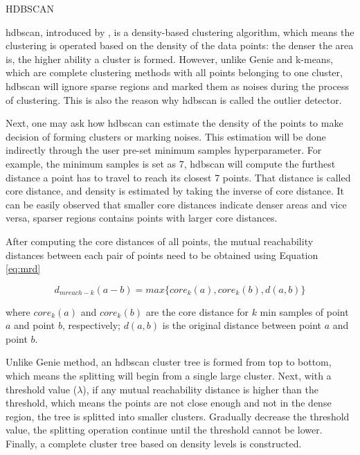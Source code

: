 \documentclass[a4paper,man,floatsintext,natbib,noextraspace]{apa6}
\makeatletter
\renewcommand{\subsubsection}{\@startsection{subsubsection}{3}
  {\z@}
  {\b@level@two@skip}
  {\e@level@two@skip}
  {\normalfont\normalsize\bfseries\itshape}}
\makeatother
\begin{document}
\subsubsection{HDBSCAN}

\gls{hdbscan}, introduced by \cite{campelloDensitybasedClusteringBased2013}, is a density-based clustering algorithm, which means the clustering is operated based on the density of the data points: the denser the area is, the higher ability a cluster is formed. However, unlike Genie and k-means, which are complete clustering methods with all points belonging to one cluster, \gls{hdbscan} will ignore sparse regions and marked them as noises during the process of clustering. This is also the reason why \gls{hdbscan} is called the outlier detector. 

Next, one may ask how \gls{hdbscan} can estimate the density of the points to make decision of forming clusters or marking noises. This estimation will be done indirectly through the user pre-set minimum samples hyperparameter. For example, the minimum samples is set as 7, \gls{hdbscan} will compute the furthest distance a point has to travel to reach its closest 7 points. That distance is called core distance, and density is estimated by taking the inverse of core distance. It can be easily observed that smaller core distances indicate denser areas and vice versa, sparser regions contains points with larger core distances.

After computing the core distances of all points, the mutual reachability distances between each pair of points need to be obtained using Equation \eqref{eq:mrd}

\begin{equation}\label{eq:mrd}
    d_{mreach-k}(a-b) = max\{core_{k}(a),core_{k}(b),d(a,b)\}
\end{equation}

where $core_{k}(a)$ and $core_{k}(b)$ are the core distance for $k$ min samples of point $a$ and point $b$, respectively; $d(a,b)$ is the original distance between point $a$ and point $b$. 

Unlike Genie method, an \gls{hdbscan} cluster tree is formed from top to bottom, which means the splitting will begin from a single large cluster. Next, with a threshold value ($\lambda$), if any mutual reachability distance is higher than the threshold, which means the points are not close enough and not in the dense region, the tree is splitted into smaller clusters. Gradually decrease the threshold value, the splitting operation continue until the threshold cannot be lower. Finally, a complete cluster tree based on density levels is constructed.
\end{document}
